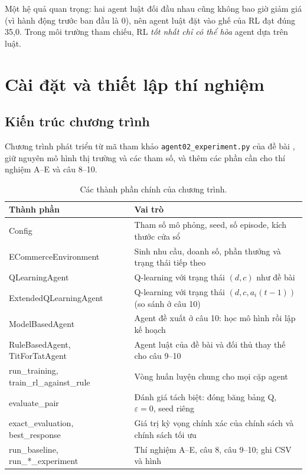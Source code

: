 \documentclass[12pt,a4paper]{report}
\begin{document}
Một hệ quả quan trọng: hai agent luật đối đầu nhau cũng không bao giờ giảm giá (vì
hành động trước ban đầu là 0), nên agent luật đặt vào ghế của RL đạt đúng 35{,}0.
Trong môi trường tham chiếu, RL \emph{tốt nhất chỉ có thể hòa} agent dựa trên luật.

\chapter{Cài đặt và thiết lập thí nghiệm}
\label{chap:setup}

\section{Kiến trúc chương trình}
Chương trình phát triển từ mã tham khảo \texttt{agent02\_experiment.py} của đề bài
\cite{complementary}, giữ nguyên mô hình thị trường và các tham số, và thêm các phần
cần cho thí nghiệm A--E và câu 8--10.

\begin{table}[H]
\centering
\small
\caption{Các thành phần chính của chương trình.}
\begin{tabularx}{\textwidth}{>{\ttfamily}p{5.2cm}X}
\toprule
\normalfont\bfseries Thành phần & \bfseries Vai trò \\
\midrule
Config & Tham số mô phỏng, seed, số episode, kích thước cửa sổ \\
ECommerceEnvironment & Sinh nhu cầu, doanh số, phần thưởng và trạng thái tiếp theo \\
QLearningAgent & Q-learning với trạng thái $(d,c)$ như đề bài \\
ExtendedQLearningAgent & Q-learning với trạng thái $(d,c,a_i(t-1))$ (so sánh ở câu 10) \\
ModelBasedAgent & Agent đề xuất ở câu 10: học mô hình rồi lập kế hoạch \\
RuleBasedAgent, TitForTatAgent & Agent luật của đề bài và đối thủ thay thế cho câu 9--10 \\
run\_training, train\_rl\_against\_rule & Vòng huấn luyện chung cho mọi cặp agent \\
evaluate\_pair & Đánh giá tách biệt: đóng băng bảng Q, $\varepsilon=0$, seed riêng \\
exact\_evaluation, best\_response & Giá trị kỳ vọng chính xác của chính sách và chính sách tối ưu \\
run\_baseline, run\_*\_experiment & Thí nghiệm A--E, câu 8, câu 9--10; ghi CSV và hình \\
\bottomrule
\end{tabularx}
\end{table}
\end{document}
